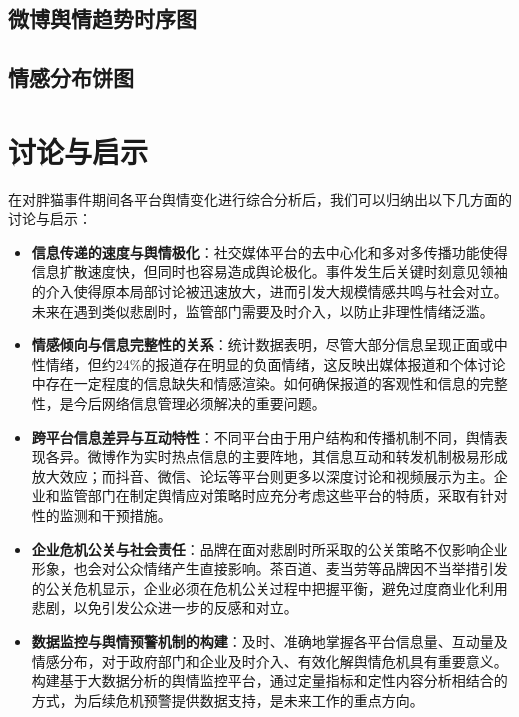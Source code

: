 \documentclass{article}
\begin{document}
\subsection{微博舆情趋势时序图}
\begin{center}
\end{center}

\subsection{情感分布饼图}
\begin{center}
\end{center}

\section{讨论与启示}
在对胖猫事件期间各平台舆情变化进行综合分析后，我们可以归纳出以下几方面的讨论与启示：
\begin{itemize}
    \item \textbf{信息传递的速度与舆情极化}：社交媒体平台的去中心化和多对多传播功能使得信息扩散速度快，但同时也容易造成舆论极化。事件发生后关键时刻意见领袖的介入使得原本局部讨论被迅速放大，进而引发大规模情感共鸣与社会对立。未来在遇到类似悲剧时，监管部门需要及时介入，以防止非理性情绪泛滥。
    \item \textbf{情感倾向与信息完整性的关系}：统计数据表明，尽管大部分信息呈现正面或中性情绪，但约24\%的报道存在明显的负面情绪，这反映出媒体报道和个体讨论中存在一定程度的信息缺失和情感渲染。如何确保报道的客观性和信息的完整性，是今后网络信息管理必须解决的重要问题。
    \item \textbf{跨平台信息差异与互动特性}：不同平台由于用户结构和传播机制不同，舆情表现各异。微博作为实时热点信息的主要阵地，其信息互动和转发机制极易形成放大效应；而抖音、微信、论坛等平台则更多以深度讨论和视频展示为主。企业和监管部门在制定舆情应对策略时应充分考虑这些平台的特质，采取有针对性的监测和干预措施。
    \item \textbf{企业危机公关与社会责任}：品牌在面对悲剧时所采取的公关策略不仅影响企业形象，也会对公众情绪产生直接影响。茶百道、麦当劳等品牌因不当举措引发的公关危机显示，企业必须在危机公关过程中把握平衡，避免过度商业化利用悲剧，以免引发公众进一步的反感和对立。
    \item \textbf{数据监控与舆情预警机制的构建}：及时、准确地掌握各平台信息量、互动量及情感分布，对于政府部门和企业及时介入、有效化解舆情危机具有重要意义。构建基于大数据分析的舆情监控平台，通过定量指标和定性内容分析相结合的方式，为后续危机预警提供数据支持，是未来工作的重点方向。
\end{itemize}
\end{document}
